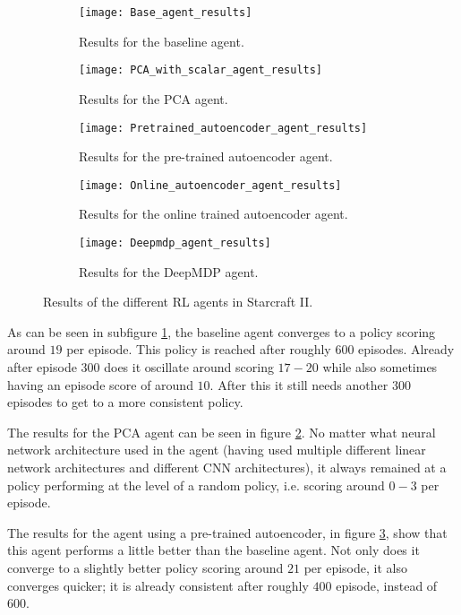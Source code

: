 \begin{figure}[h!]
	\centering
	\begin{subfigure}[b]{0.45\textwidth}
		\texttt{[image: Base\_agent\_results]}
		\caption{Results for the baseline agent.}
		\label{fig:results-base} 
	\end{subfigure}\hfill
	\begin{subfigure}[b]{0.45\textwidth}
		\texttt{[image: PCA\_with\_scalar\_agent\_results]}
		\caption{Results for the PCA agent.}
		\label{fig:results-pca}
	\end{subfigure}
	
	\medskip
	\begin{subfigure}[b]{0.45\textwidth}
		\texttt{[image: Pretrained\_autoencoder\_agent\_results]}
		\caption{Results for the pre-trained autoencoder agent.}
		\label{fig:results-ae}
	\end{subfigure} \hfill
	\begin{subfigure}[b]{0.45\textwidth}
		\texttt{[image: Online\_autoencoder\_agent\_results]}
		\caption{Results for the online trained autoencoder agent.}
		\label{fig:results-online-ae}
	\end{subfigure}
	
	\medskip
	\begin{subfigure}[b]{0.45\textwidth}
		\texttt{[image: Deepmdp\_agent\_results]}
		\caption{Results for the DeepMDP agent.}
		\label{fig:results-deepmdp}
	\end{subfigure}
	\caption{Results of the different RL agents in Starcraft II.}
	\label{fig:results-agents}
\end{figure}

As can be seen in subfigure \ref{fig:results-base}, the baseline agent converges to a policy scoring around $19$ per episode. This policy is reached after roughly $600$ episodes. Already after episode $300$ does it oscillate around scoring $17-20$ while also sometimes having an episode score of around $10$. After this it still needs another $300$ episodes to get to a more consistent policy.

The results for the PCA agent can be seen in figure \ref{fig:results-pca}. No matter what neural network architecture used in the agent (having used multiple different linear network architectures and different CNN architectures), it always remained at a policy performing at the level of a random policy, i.e. scoring around $0-3$ per episode.

The results for the agent using a pre-trained autoencoder, in figure \ref{fig:results-ae}, show that this agent performs a little better than the baseline agent. Not only does it converge to a slightly better policy scoring around $21$ per episode, it also converges quicker; it is already consistent after roughly $400$ episode, instead of $600$. 

